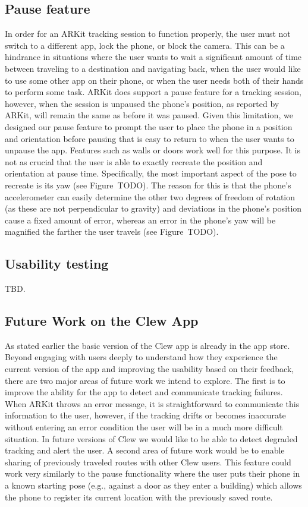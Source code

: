 \documentclass[chi_draft]{sigchi}
\begin{document}
\subsection{Pause feature}
In order for an ARKit tracking session to function properly, the user must not switch to a different app, lock the phone, or block the camera.  This can be a hindrance in situations where the user wants to wait a significant amount of time between traveling to a destination and navigating back, when the user would like to use some other app on their phone, or when the user needs both of their hands to perform some task.  ARKit does support a pause feature for a tracking session, however, when the session is unpaused the phone's position, as reported by ARKit, will remain the same as before it was paused.  Given this limitation, we designed our pause feature to prompt the user to place the phone in a position and orientation before pausing that is easy to return to when the user wants to unpause the app.  Features such as walls or doors work well for this purpose.  It is not as crucial that the user is able to exactly recreate the position and orientation at pause time.  Specifically, the most important aspect of the pose to recreate is its yaw (see Figure~TODO).  The reason for this is that the phone's accelerometer can easily determine the other two degrees of freedom of rotation (as these are not perpendicular to gravity) and deviations in the phone's position cause a fixed amount of error, whereas an error in the phone's yaw will be magnified the farther the user travels (see Figure~TODO).

\subsection{Usability testing}
TBD.

\subsection{Future Work on the Clew App}
As stated earlier the basic version of the Clew app is already in the app store.  Beyond engaging with users deeply to understand how they experience the current version of the app and improving the usability based on their feedback, there are two major areas of future work we intend to explore.  The first is to improve the ability for the app to detect and communicate tracking failures.  When ARKit throws an error message, it is straightforward to communicate this information to the user, however, if the tracking drifts or becomes inaccurate without entering an error condition the user will be in a much more difficult situation.  In future versions of Clew we would like to be able to detect degraded tracking and alert the user.  A second area of future work would be to enable sharing of previously traveled routes with other Clew users.  This feature could work very similarly to the pause functionality where the user puts their phone in a known starting pose (e.g., against a door as they enter a building) which allows the phone to register its current location with the previously saved route.
\end{document}
